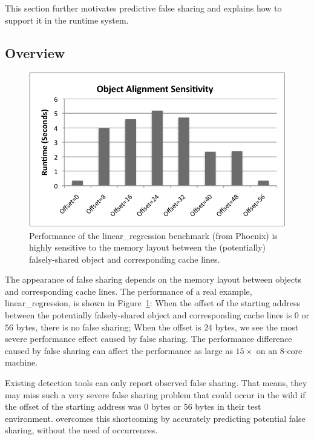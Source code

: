 \label{sec:prediction}
This section further motivates predictive false sharing and explains how to support it in the runtime system.  

\subsection{Overview}
\label{sec:predictoverview}

\begin{figure}[!t]
\begin{center}
\includegraphics[width=6in]{predator/figure/perfsensitive}
\end{center}
\caption{
Performance of the linear\_regression benchmark (from Phoenix)  is highly sensitive to the memory layout between the (potentially) falsely-shared object and corresponding cache lines. 
\label{fig:perfsensitive}}
\end{figure}

The appearance of false sharing depends on 
the memory layout between objects and corresponding cache lines. The performance of a real example, linear\_regression, is shown in Figure~\ref{fig:perfsensitive}: 
When the offset of the starting address between the potentially falsely-shared object and corresponding cache lines is $0$ or $56$ bytes, there is no false sharing; 
When the offset is $24$ bytes, we see the most severe performance effect caused by false sharing. 
The performance difference caused by false sharing can affect the performance as large as $15\times$ on an 8-core machine. 

Existing detection tools can only report observed false sharing. That means, they may miss such a very severe false sharing problem that could occur in the wild if the offset of the starting address was $0$ bytes or $56$ bytes in their test environment. \Predator{} overcomes this shortcoming by accurately predicting potential false sharing, without the need of occurrences. 

